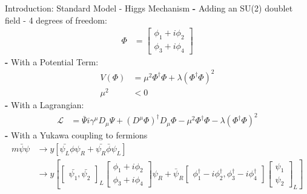\documentclass[pdf, 9pt]{beamer}
\begin{document}
  \begin{frame}{Introduction: Standard Model - Higgs Mechanism}
    \textbf{-} Adding an SU(2) doublet field - 4 degrees of freedom:\\
    \begin{align}\Phi& =\begin{bmatrix} \phi_1 + i\phi_2 \\ \phi_3 + i\phi_4 \end{bmatrix}\end{align}
    \textbf{-} With a Potential Term:\\\vspace{-0.3cm}
    \begin{subequations}
    \begin{align}
      V(\Phi)& = \mu^2\Phi^{\dagger}\Phi + \lambda(\Phi^{\dagger}\Phi)^2\\
      \mu^2& < 0
    \end{align}
    \end{subequations}
    \textbf{-} With a Lagrangian:\\\vspace{-0.3cm}
    \begin{subequations}
    \begin{align}
      \mathcal{L}& = \bar{\Psi}i\gamma^{\mu}D_{\mu}\Psi + (D^{\mu}\Phi)^{\dagger}D_{\mu}\Phi - \mu^2\Phi^{\dagger}\Phi - \lambda(\Phi^{\dagger}\Phi)^2
    \end{align}
    \end{subequations}
    \textbf{-} With a Yukawa coupling to fermions
    \begin{subequations}
    \begin{align}
      m\bar{\psi}\psi& \rightarrow y [\bar{\psi_L}\phi\psi_R + \bar{\psi_R}\bar{\phi}\psi_L]\\
      & \rightarrow y[\begin{bmatrix} \bar{\psi_1}, \bar{\psi_2} \end{bmatrix}_L\begin{bmatrix} \phi_1 + i\phi_2 \\ \phi_3 + i\phi_4 \end{bmatrix} \psi_R + \bar{\psi}_R\begin{bmatrix} \phi_1^{\dagger} - i\phi_2^{\dagger}, \phi_3^{\dagger} - i\phi_4^{\dagger} \end{bmatrix}\begin{bmatrix} \psi_1 \\ \psi_2 \end{bmatrix}_L]
    \end{align}
    \end{subequations}
  \end{frame}
\end{document}
